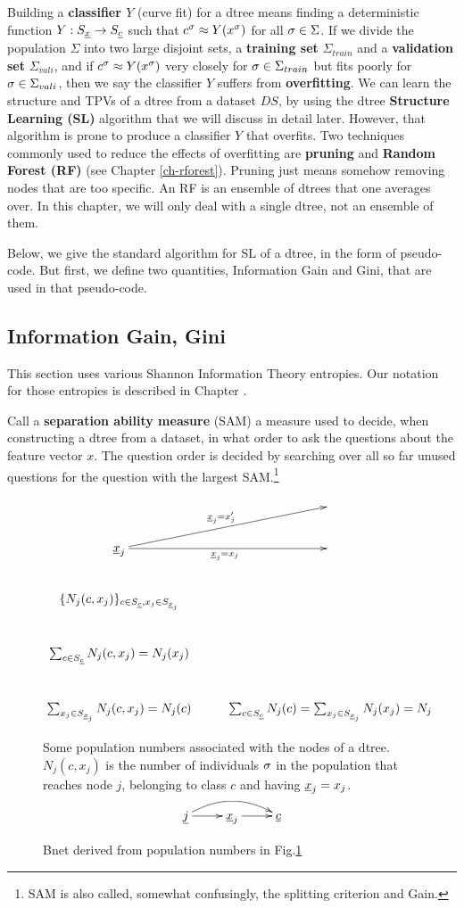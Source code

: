 Building a {\bf classifier $Y$} 
(curve fit) for a dtree means
finding a deterministic
function $Y:S_{\underline{x}}\rightarrow S_{\underline{c}}$ 
such that 
$c^\sigma \approx Y(x^\sigma)$
for all $\sigma\in \Sigma$.
If we divide
the population
$\Sigma$ 
into two large 
disjoint
sets, a {\bf training set} $\Sigma_{train}$
and a {\bf validation set} $\Sigma_{vali}$,
and if $c^\sigma \approx Y(x^\sigma)$ very closely
for $\sigma\in \Sigma_{train}$
but fits poorly
for $\sigma\in \Sigma_{vali}$,
then we say the classifier  $Y$
suffers from {\bf overfitting}.
We can learn the structure
and TPVs of a dtree from a dataset $DS$,
by using the
dtree {\bf Structure Learning (SL)}
algorithm that we will 
discuss in detail later. However,
that algorithm
is prone to produce
a classifier $Y$ that overfits.
Two techniques 
commonly used to 
reduce the effects of overfitting
are {\bf pruning}  and 
{\bf Random Forest (RF)}
(see Chapter \ref{ch-rforest}).
Pruning just means somehow
removing nodes that are
too specific. 
An RF is an ensemble of dtrees 
that one averages over.
In this chapter, we will only deal
with a single dtree,
not an ensemble of them. 


Below,
we give the standard
algorithm for SL
of a dtree, in the form
of pseudo-code.
But first,
we define
two quantities,
Information Gain and
Gini,
that are 
used in that 
pseudo-code.


\subsection{Information Gain, Gini}
This section uses various Shannon Information Theory
entropies. Our 
notation for those
entropies
is described in Chapter .


Call a {\bf separation ability measure} (SAM)
a measure used 
to decide, when 
constructing a dtree from a dataset,
in what order 
to ask the questions
about the feature vector $x$.
The question order is decided
by searching 
over all so far unused questions
for the question with 
the largest SAM.\footnote{SAM
is also called, somewhat
confusingly, the splitting
criterion and Gain.}



\begin{figure}[h!]
$$
\xymatrix{
&
\\
\rvx_j\ar[r]_{\rvx_j=x_j}
\ar[ru]^{\rvx_j=x_j'}&
\\
\{N_j(c,x_j)\}_{c\in S_\rvc, x_j\in S_{\rvx_j}}
\\
\sum_{c\in S_\rvc}N_j(c,x_j)=N_j(x_j)
\\
\sum_{x_j\in S_{\rvx_j}}N_j(c,x_j)=N_j(c)
&
\sum_{c\in S_\rvc}N_j(c)=
\sum_{x_j\in S_{\rvx_j}}N_j(x_j)=N_j
}
$$
\caption{
Some population numbers associated
with the nodes of a dtree. $N_j(c, x_j)$ is the number
of individuals $\sigma$
in the population that reaches node $j$,
belonging to class $c$ and having ${\underline{x}}_j=x_j$.} 
\label{fig-dtree-notation}
\end{figure}
\begin{figure}[h!]
$$
\xymatrix{
\rvj
\ar[r]\ar@/^1pc/[rr]
&
\rvx_j \ar[r]
&
\rvc
}$$
\caption{Bnet derived from population
numbers in Fig.\ref{fig-dtree-notation}}
\label{fig-class-bnet}
\end{figure}



